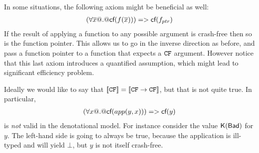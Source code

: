 In some situations, the following axiom might be beneficial as well:
\[\begin{array}{l}
    (\forall \overline{x} @.@ \textsf{cf}(f(\overline{x}))) => \textsf{cf}(f_{ptr})
\end{array}\]
If the result of applying a function to any possible argument is crash-free then
so is the function pointer. This allows us to go in the inverse direction as before,
and pass a function pointer to a function that expects a ${\tt CF}$ argument. However notice
that this last axiom introduces a quantified assumption, which might lead to significant
efficiency problem.

Ideally we would like to say that $[\![{\tt CF}]\!] = [\![{\tt CF} \rightarrow {\tt CF}]\!]$,
but that is not quite true.  In particular,
\[\begin{array}{l}
   (\forall x @.@ \textsf{cf}(app(y,x))) => \textsf{cf}(y)
\end{array}\]
is {\em not} valid in the denotational model. For instance consider the
value $\mathsf{K}(\mathsf{Bad})$ for $y$. The left-hand side is going to always
be true, because the application is ill-typed and will yield $\bot$, but $y$
is not itself crash-free.


